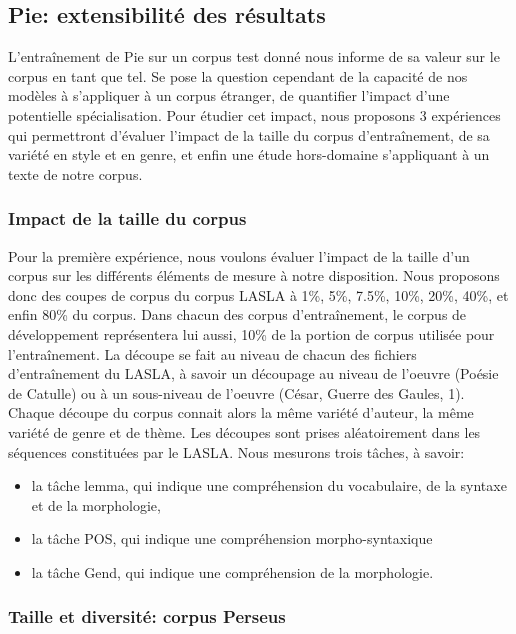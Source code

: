 \subsection{Pie: extensibilité des résultats}

L'entraînement de Pie sur un corpus test donné nous informe de sa valeur sur le corpus en tant que tel. Se pose la question cependant de la capacité de nos modèles à s'appliquer à un corpus étranger, de quantifier l'impact d'une potentielle spécialisation. Pour étudier cet impact, nous proposons 3 expériences qui permettront d'évaluer l'impact de la taille du corpus d'entraînement, de sa variété en style et en genre, et enfin une étude hors-domaine s'appliquant à un texte de notre corpus.

\subsubsection{Impact de la taille du corpus}
\label{lemmatisation:extensibilite:tailles}

Pour la première expérience, nous voulons évaluer l'impact de la taille d'un corpus sur les différents éléments de mesure à notre disposition. Nous proposons donc des coupes de corpus du corpus LASLA à 1\%, 5\%, 7.5\%, 10\%, 20\%, 40\%, et enfin 80\% du corpus. Dans chacun des corpus d'entraînement, le corpus de développement représentera lui aussi, 10\% de la portion de corpus utilisée pour l'entraînement. La découpe se fait au niveau de chacun des fichiers d'entraînement du LASLA, à savoir un découpage au niveau de l'oeuvre (Poésie de Catulle) ou à un sous-niveau de l'oeuvre (César, Guerre des Gaules, 1). Chaque découpe du corpus connait alors la même variété d'auteur, la même variété de genre et de thème. Les découpes sont prises aléatoirement dans les séquences constituées par le LASLA. Nous mesurons trois tâches, à savoir:

\begin{itemize}
    \item la tâche lemma, qui indique une compréhension du vocabulaire, de la syntaxe et de la morphologie,
    \item la tâche POS, qui indique une compréhension morpho-syntaxique
    \item la tâche Gend, qui indique une compréhension de la morphologie.
\end{itemize}

\subsubsection{Taille et diversité: corpus Perseus}
\label{lemmatisation:extensibilite:perseus}

